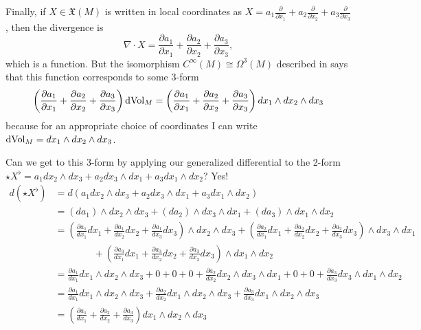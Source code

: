 Finally, if $X \in \mathfrak{X}(M)$ is written in local coordinates as $X = a_1 \frac{\partial }{\partial x_1} + a_2 \frac{\partial }{\partial x_2} + a_3 \frac{\partial }{\partial x_3}$, then the divergence is
\[
	\nabla \cdot X = \frac{\partial a_1}{\partial x_1} + \frac{\partial a_2}{\partial x_2} + \frac{\partial a_3}{\partial x_3},
\]
which is a function. But the isomorphism $C^\infty(M) \cong \Omega^3(M)$ described in  says that this function corresponds to some 3-form
\[
	\left(\frac{\partial a_1}{\partial x_1} + \frac{\partial a_2}{\partial x_2} + \frac{\partial a_3}{\partial x_3}\right) \operatorname{dVol}_M = \left(\frac{\partial a_1}{\partial x_1} + \frac{\partial a_2}{\partial x_2} + \frac{\partial a_3}{\partial x_3}\right)dx_1 \wedge dx_2 \wedge dx_3
\]
because for an appropriate choice of coordinates I can write $\operatorname{dVol}_M = dx_1 \wedge dx_2 \wedge dx_3$.

Can we get to this 3-form by applying our generalized differential to the 2-form $\star X^\flat = a_1 dx_2 \wedge dx_3 + a_2 dx_3 \wedge dx_1 + a_3 dx_1 \wedge dx_2$? Yes!
\begin{align*}
	d(\star X^\flat) & = d(a_1 dx_2 \wedge dx_3 + a_2 dx_3 \wedge dx_1 + a_3 dx_1 \wedge dx_2) \\
	& = (da_1) \wedge dx_2 \wedge dx_3 + (da_2) \wedge dx_3 \wedge dx_1 + (da_3) \wedge dx_1 \wedge dx_2 \\
	& = \left( \frac{\partial a_1}{dx_1} dx_1  + \frac{\partial a_1}{dx_2} dx_2 + \frac{\partial a_1}{dx_3} dx_3 \right)\wedge dx_2 \wedge dx_3 + \left( \frac{\partial a_2}{dx_1} dx_1  + \frac{\partial a_2}{dx_2} dx_2 + \frac{\partial a_2}{dx_3} dx_3 \right)\wedge dx_3 \wedge dx_1 \\
	& \qquad \qquad + \left( \frac{\partial a_3}{dx_1} dx_1  + \frac{\partial a_3}{dx_2} dx_2 + \frac{\partial a_3}{dx_3} dx_3 \right)\wedge dx_1 \wedge dx_2 \\
	& = \frac{\partial a_1}{dx_1} dx_1\wedge dx_2 \wedge dx_3 + 0 + 0 + 0 + \frac{\partial a_2}{dx_2} dx_2 \wedge dx_3 \wedge dx_1 + 0 + 0 +  \frac{\partial a_3}{dx_3} dx_3 \wedge dx_1 \wedge dx_2 \\
	& = \frac{\partial a_1}{dx_1} dx_1\wedge dx_2 \wedge dx_3 + \frac{\partial a_2}{dx_2} dx_1 \wedge dx_2 \wedge dx_3 + \frac{\partial a_3}{dx_3} dx_1 \wedge dx_2 \wedge dx_3 \\
	& = \left(\frac{\partial a_1}{dx_1} + \frac{\partial a_2}{dx_2} + \frac{\partial a_3}{dx_3}\right) dx_1 \wedge dx_2 \wedge dx_3
\end{align*}

